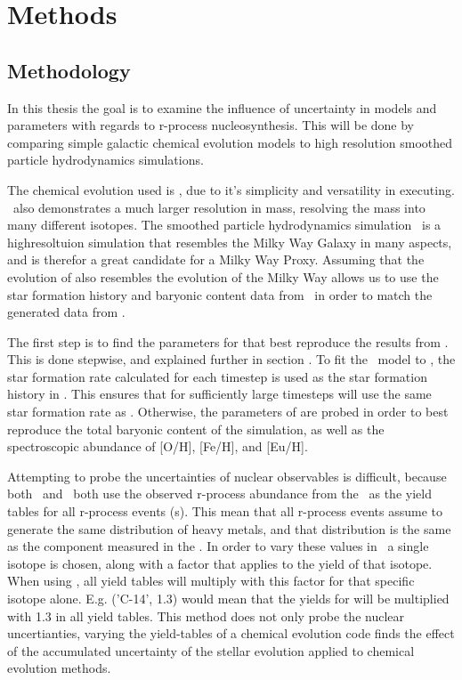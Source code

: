 \chapter{Methods}
\label{sec:methods}

\section{Methodology}

In this thesis the goal is to examine the influence of uncertainty in models and parameters
with regards to r-process nucleosynthesis. This will be done by comparing simple galactic chemical evolution models to high resolution smoothed particle hydrodynamics simulations.

The chemical evolution used is \omegamodel, due to it's simplicity and versatility in executing. \omegamodel\ also demonstrates a much larger resolution in mass, resolving the mass into many different isotopes.
The smoothed particle hydrodynamics simulation \eris\ is a highresoltuion simulation that resembles the Milky Way Galaxy in many aspects, and is therefor a great candidate for a Milky Way Proxy. Assuming that the evolution of \eris also resembles the evolution of the Milky Way allows us to use the star formation history and baryonic content data from \eris\ in order to match the generated data from \omegamodel.

The first step is to find the parameters for \omegamodel that best reproduce the results from \eris\cite{shen15}. This is done stepwise, and explained further in section .
To fit the \omegamodel\ model to \eris, the star formation rate calculated for each timestep is used as the star formation history in \omegamodel. This ensures that for sufficiently large timesteps \omegamodel will use the same star formation rate as \eris.
Otherwise, the parameters of \omegamodel are probed in order to best reproduce the total baryonic content of the simulation, as well as the spectroscopic abundance of [O/H], [Fe/H], and [Eu/H].

Attempting to probe the uncertainties of nuclear observables is difficult, because both \eris\ and \omegamodel\ both use the observed r-process abundance from the \sos\ as the yield tables for all r-process events (\nsm\-s). This mean that all r-process events assume to generate the same distribution of heavy metals, and that distribution is the same as the component measured in the \sos.
In order to vary these values in \omegamodel\ a single isotope is chosen, along with a factor that applies to the yield of that isotope. When using \omegamodel, all yield tables will multiply with this factor for that specific isotope alone. E.g. ('C-14', 1.3) would mean that the yields for  will be multiplied with 1.3 in all yield tables.
This method does not only probe the nuclear uncertianties, varying the yield-tables of a chemical evolution code finds the effect of the accumulated uncertainty of the stellar evolution applied to chemical evolution methods.

